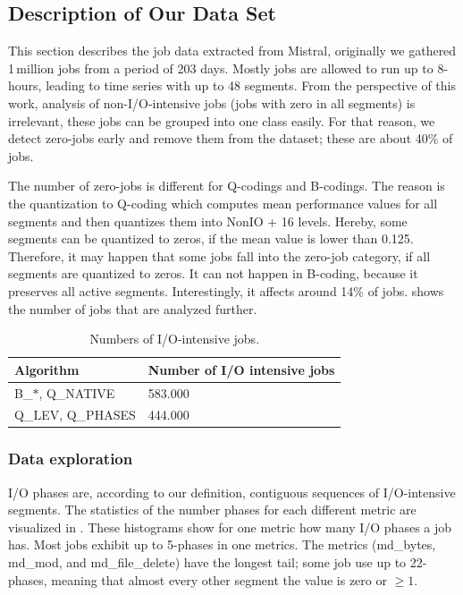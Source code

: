 \documentclass{jhps}
\begin{document}
\subsection{Description of Our Data Set}
This section describes the job data extracted from Mistral, originally we gathered 1\,million jobs from a period of 203 days.
Mostly jobs are allowed to run up to 8-hours, leading to time series with up to 48 segments.
From the perspective of this work, analysis of non-I/O-intensive jobs (jobs with zero in all segments) is irrelevant, these jobs can be grouped into one class easily.
For that reason, we detect zero-jobs early and remove them from the dataset; these are about 40\% of jobs.

The number of zero-jobs is different for Q-codings and B-codings.
The reason is the quantization to Q-coding which computes mean performance values for all segments and then quantizes them into NonIO + 16 levels.
Hereby, some segments can be quantized to zeros, if the mean value is lower than 0.125.
Therefore, it may happen that some jobs fall into the zero-job category, if all segments are quantized to zeros.
It can not happen in B-coding, because it preserves all active segments.
Interestingly, it affects around 14$\%$ of jobs.
 shows the number of jobs that are analyzed further.

\begin{table}
  \centering
  \begin{tabular}{ll}
    Algorithm & Number of I/O intensive jobs \\
    \midrule
    B\_$\ast$, Q\_NATIVE &  583.000 \\
    Q\_LEV, Q\_PHASES &  444.000 \\
  \end{tabular}
  \caption{Numbers of I/O-intensive jobs.}
  \label{tab:n_intensive_jobs}
\end{table}


\subsubsection{Data exploration}
I/O phases are, according to our definition, contiguous sequences of I/O-intensive segments.
The statistics of the number phases for each different metric are visualized in .
These histograms show for one metric how many I/O phases a job has.
Most jobs exhibit up to 5-phases in one metrics.
The metrics (md\_bytes, md\_mod, and md\_file\_delete) have the longest tail; some job use up to 22-phases, meaning that almost every other segment the value is zero or $\geq 1$.
\end{document}
